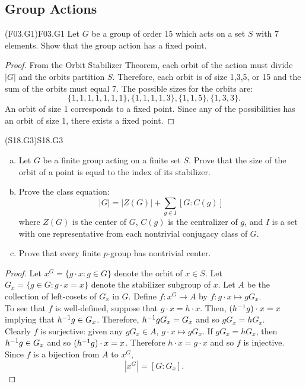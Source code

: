 \documentclass[../../AlgebraQualSolutions.tex]{subfiles}
\begin{document}
\subsection{Group Actions}

\begin{prob}{(F03.G1)}{F03.G1}
    Let $G$ be a group of order 15 which acts on a set $S$ with 7 elements. Show that the group action has a fixed point.
\end{prob}

\begin{proof}
    From the Orbit Stabilizer Theorem, each orbit of the action must divide $|G|$ and the orbits partition $S$. Therefore, each orbit is of size 1,3,5, or 15 and the sum of the orbits must equal 7. The possible sizes for the orbits are:
        \[\{1,1,1,1,1,1,1\}, \{1,1,1,1,3\}, \{1,1,5\}, \{1,3,3\}.\]
    An orbit of size 1 corresponds to a fixed point. Since any of the possibilities has an orbit of size 1, there exists a fixed point.
\end{proof}

\begin{prob}{(S18.G3)}{S18.G3}
    \begin{enumerate}[(a)]
        \item Let $G$ be a finite group acting on a finite set $S$. Prove that the size of the orbit of a point is equal to the index  of its stabilizer.
        \item Prove  the class equation:
            \[|G| = |Z(G)| + \sum_{g \in I}[G: C(g)]\]
        where $Z(G)$ is the center of $G$, $C(g)$ is the centralizer of $g$, and $I$ is a set with one representative from each nontrivial conjugacy class of $G$.
        \item Prove  that every finite $p$-group has nontrivial center.
    \end{enumerate}
\end{prob}

\begin{proof}
    Let $x^G = \{g\cdot x: g \in G\}$ denote the orbit of $x \in S$. Let $G_x = \{g \in G: g\cdot x = x\}$ denote the stabilizer subgroup of $x$. Let $A$ be the collection of left-cosets of $G_x$ in $G$. Define $f: x^G \to A$ by $f: g\cdot x \mapsto gG_x$.\\

    To see that $f$ is well-defined, suppose that $g\cdot x = h \cdot x$. Then, $(h^{-1} g)\cdot x = x$ implying that $h^{-1} g \in G_x$. Therefore, $h^{-1} g G_x = G_x$ and so $gG_x = hG_x$.\\

    Clearly $f$ is surjective: given any $gG_x \in A$, $g\cdot x \mapsto gG_x$. If $gG_x = hG_x$, then $h^{-1} g \in G_x$ and so $(h^{-1} g) \cdot x = x$. Therefore $h\cdot x = g\cdot x$ and so $f$ is injective.\\

    Since $f$ is a bijection from $A$ to $x^G$,
        \[|x^G| = [G: G_x].\]
\end{proof}
\end{document}
